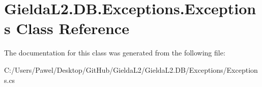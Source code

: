 \hypertarget{class_gielda_l2_1_1_d_b_1_1_exceptions_1_1_exceptions}{}\section{Gielda\+L2.\+D\+B.\+Exceptions.\+Exceptions Class Reference}
\label{class_gielda_l2_1_1_d_b_1_1_exceptions_1_1_exceptions}


The documentation for this class was generated from the following file\+:\begin{DoxyCompactItemize}
\item 
C\+:/\+Users/\+Pawel/\+Desktop/\+Git\+Hub/\+Gielda\+L2/\+Gielda\+L2.\+D\+B/\+Exceptions/Exceptions.\+cs\end{DoxyCompactItemize}
